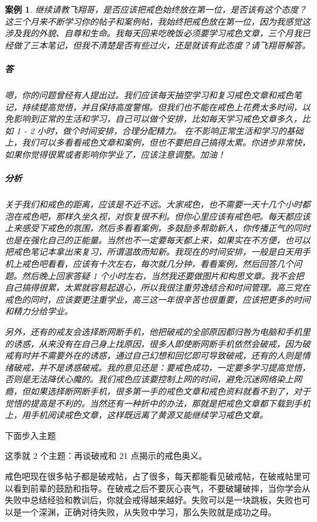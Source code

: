 \documentclass[fontset=founder]{ctexart}
\newtheorem{case}{案例}
\begin{document}
\begin{case}
    继续请教飞翔哥，是否应该把戒色始终放在第一位，是否该有这个态度？这三个月来不断学习你的帖子和案例帖，我始终把戒色放在第一位，因为我感觉这涉及我的外貌、自尊和生命。我每天回来吃晚饭必须要学习戒色文章，三个月我已经做了三本笔记，但我不清楚是否有些过火，还是就该有此态度？请飞翔哥解答。

    \subparagraph{答} 嗯，你的问题曾经有人提出过。我们应该每天抽空学习和复习戒色文章和戒色笔记，持续提高觉悟，并且保持高度警惕。但我们也不能在戒色上花费太多时间，以免影响到正常的生活和学习，自己可以做个安排，比如每天学习戒色文章多久，比如 1 - 2 小时，做个时间安排，合理分配精力。 在不影响正常生活和学习的基础上，我们可以多看看戒色文章和案例，但也不要把自己搞得太累。你进步非常快，如果你觉得很累或者影响你学业了，应该注意调整。加油！

    \subparagraph{分析} 关于我们和戒色的距离，应该是不近不远。大家戒色，也不需要一天十几个小时都泡在戒色吧，那样久坐久视，对恢复很不利。但你心里应该有戒色吧。每天都应该上来感受下戒色的氛围，然后多看看案例，多鼓励多帮助新人，你传播正气的同时也是在强化自己的正能量。当然也不一定要每天都上来，如果实在不方便，也可以把戒色笔记本拿出来复习，所谓温故而知新。我现在的时间安排，一般是白天用手机上戒色吧看看，应该有十次左右，每次就几分钟，看看案例，然后回答几个问题。然后晚上回家答疑 1 个小时左右，当然我还要做图片和构思文章。我不会把自己搞得很累，太累就容易起退心，所以我很注重劳逸结合和时间管理。高三党在戒色的同时，应该要更注重学业，高三这一年很辛苦也很重要，应该把更多的时间和精力分给学业。

    另外，还有的戒友会选择断网断手机，他把破戒的全部原因都归咎为电脑和手机里的诱惑，从来没有在自己身上找原因，很多人即使断网断手机依然会破戒，因为破戒有时并不需要外在的诱惑，通过自己幻想和回忆即可导致破戒，还有的人则是情绪破戒，并不是诱惑破戒。我的意见还是：要戒色成功，一定要多学习提高觉悟，否则是无法降伏心魔的。我们戒色应该要控制上网的时间，避免沉迷网络染上网瘾，但如果选择断网断手机，很多第一手的戒色文章和戒色资料就看不到了，对于觉悟的提高是不利的。当然还有一种折中的办法，那就是把戒色文章都下载到手机上，用手机阅读戒色文章，这样既远离了黄源又能继续学习戒色文章。
\end{case}

下面步入主题

这季就 2 个主题：再谈破戒和 21 点揭示的戒色奥义。

戒色吧现在很多帖子都是破戒帖，占了很多，每天都能看见破戒帖，在破戒帖里可以看到前辈的鼓励和指导。在破戒之后不要灰心丧气，不要破罐破摔，当你学会从失败中总结经验和教训后，你就会戒得越来越好。失败可以是一块跳板，失败也可以是一个深渊，正确对待失败，从失败中学习，那么失败就是成功之母。
\end{document}
